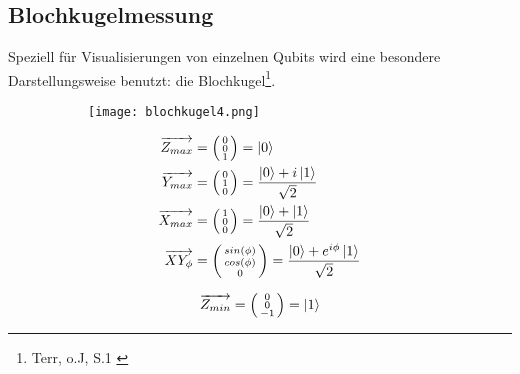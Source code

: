 \documentclass[12pt]{report}
\begin{document}
\subsection{Blochkugelmessung}	
Speziell für Visualisierungen von einzelnen Qubits wird eine besondere Darstellungsweise benutzt: die Blochkugel\footnote{Terr, o.J, S.1 \cite{p242-1}}.
	\begin{figure}[h]
		\centering
		\begin{subfigure}{.34\textwidth}
		\centering
		\texttt{[image: blochkugel4.png]}
		\end{subfigure}
		\begin{subfigure}{.27\textwidth}
  		\begin{align*}
  			\overrightarrow{Z_{max}} &= \left( \begin{smallmatrix} 0\\0\\1 \end{smallmatrix} \right) = \ket{0} \\
  			\overrightarrow{Y_{max}} &= \left( \begin{smallmatrix} 0\\1\\0 \end{smallmatrix} \right) = \frac{\ket{0}+i\ket{1}}{\sqrt{2}} \\
  			\overrightarrow{X_{max}} &= \left( \begin{smallmatrix} 1\\0\\0 \end{smallmatrix} \right) = \frac{\ket{0}+\ket{1}}{\sqrt{2}} \\
  			\overrightarrow{XY_{\phi}} &= \left( \begin{smallmatrix} sin(\phi)\\cos(\phi)\\0 \end{smallmatrix} \right) = \frac{\ket{0}+e^{i\phi}\ket{1}}{\sqrt{2}}
  		\end{align*}
		\end{subfigure}
		\begin{subfigure}{.27\textwidth}
  		\begin{align*}
  			\overrightarrow{Z_{min}} &= \left( \begin{smallmatrix} 0\\0\\-1 \end{smallmatrix} \right) = \ket{1} \\

\end{align*}
\end{subfigure}
\end{figure}
\end{document}
